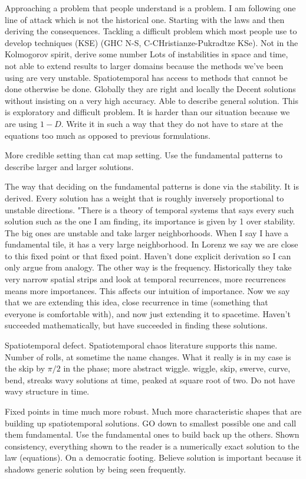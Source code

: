 \begin{description}
{Approaching a problem that people understand is a problem. I am following
one line of attack which is not the historical one. Starting with the laws
and then deriving the consequences. Tackling a difficult problem which
most people use to develop techniques (KSE) (GHC N-S, C-CHristianze-Pukradtze KSe).
Not in the Kolmogorov spirit, derive some number Lots of instabilities
in space and time, not able to extend results to larger domains because
the methods we've been using are very unstable. Spatiotemporal has access
to methods that cannot be done otherwise be done. Globally they
are right and locally the
Decent solutions without insisting on a very high accuracy. Able to describe
general solution. This is exploratory and difficult problem. It is harder
than our situation because we are using $1-D$. Write it in such a way that they
do not have to stare at the equations too much as opposed to previous formulations.

More credible setting than cat map setting. Use the fundamental patterns to
describe larger and larger solutions.

The way that deciding on the fundamental patterns is done via the stability.
It is derived. Every solution has a weight that is roughly inversely proportional
to unstable directions. "There is a theory of temporal systems that says every such
solution such as the one I am finding, its importance is given by 1 over stability.
The big ones are unstable and take larger neighborhoods. When I say I have a fundamental tile,
it has a very large neighborhood. In Lorenz we say we are close to this fixed point or that fixed
point. Haven't done explicit derivation so I can only argue from analogy. The other
way is the frequency. Historically they take very narrow spatial strips and look at temporal
recurrences, more recurrences means more importances. This affects our intuition of importance.
Now we say that we are extending this idea, close recurrence in time (something that
everyone is comfortable with), and now just extending it to spacetime. Haven't
succeeded mathematically, but have succeeded in finding these solutions.

Spatiotemporal defect. Spatiotemporal chaos literature supports this name.
Number of rolls, at sometime the name changes. What it really is
in my case is the skip by $\pi / 2$ in the phase; more abstract wiggle.
wiggle, skip, swerve, curve, bend, streaks
wavy solutions at time, peaked at square root of two. Do not have wavy
structure in time.

Fixed points in time much more robust. Much more characteristic
shapes that are building up spatiotemporal solutions. GO down to
smallest possible one and call them fundamental. Use the fundamental
ones to build back up the others. Shown consistency, everything shown to the
reader is a numerically exact solution to the law (equations). On
a democratic footing. Believe solution is important because it shadows
generic {\spt} solution by being seen frequently.

}
\end{description}
